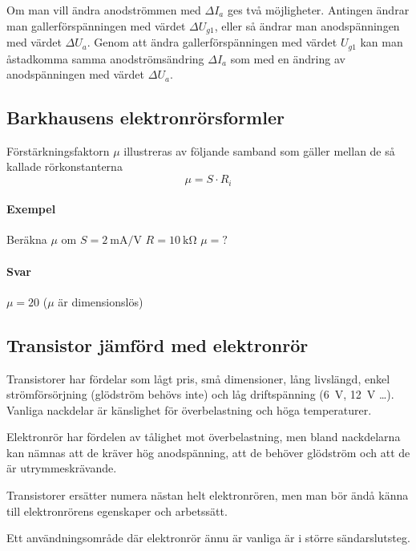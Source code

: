 \noindent
Om man vill ändra anodströmmen med \(\Delta I_a\) ges två möjligheter.
Antingen ändrar man gallerförspänningen med värdet \(\Delta U_{g1}\), eller så
ändrar man anodspänningen med värdet \(\Delta U_a\).
Genom att ändra gallerförspänningen med värdet \(U_{g1}\) kan man åstadkomma
samma anodströmsändring \(\Delta I_a\) som med en ändring av anodspänningen
med värdet \(\Delta U_a\).

\subsection{Barkhausens elektronrörsformler}

Förstärkningsfaktorn \(\mu \) illustreras av följande samband som gäller mellan
de så kallade rörkonstanterna
\[\mu = S \cdot R_i\]
\paragraph{Exempel}
Beräkna \(\mu\)  om \(S = \SI{2}{\milli\ampere\per\volt}\) \(R = \SI{10}{\kilo\ohm}\) \(\mu = ?\)

\paragraph{Svar} \(\mu = 20\) (\(\mu\)  är dimensionslös)

\subsection{Transistor jämförd med elektronrör}

Transistorer har fördelar som lågt pris, små dimensioner, lång livslängd, enkel
strömförsörjning (glödström behövs inte) och låg driftspänning (\SI{6}{\volt},
\SI{12}{\volt} \ldots ).
Vanliga nackdelar är känslighet för överbelastning och höga temperaturer.

Elektronrör har fördelen av tålighet mot överbelastning, men bland nackdelarna
kan nämnas att de kräver hög anodspänning, att de behöver glödström och att de
är utrymmeskrävande.

Transistorer ersätter numera nästan helt elektronrören, men man bör ändå känna
till elektronrörens egenskaper och arbetssätt.

Ett användningsområde där elektronrör ännu är vanliga är i större
sändarslutsteg.

